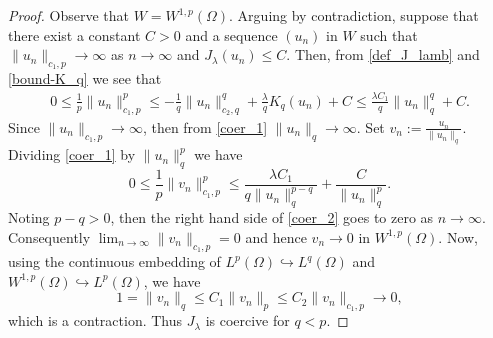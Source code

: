\documentclass[pdflatex,sn-mathphys-num]{sn-jnl}
\theoremstyle{thmstyleone}%
\theoremstyle{thmstyletwo}%
\theoremstyle{thmstylethree}%
\theoremstyle{thmstylethree}%
\begin{document}
\begin{proof}
    Observe that $W=W^{1,p}(\Omega)$.
    Arguing by contradiction,  suppose that there exist a constant $C>0$ and a sequence $(u_n)$ in $W$ such that $\|u_n\|_{c_1,p} \to \infty $ as $n\to \infty$ and $J_\lambda (u_n)\leqslant C$. Then,  from \eqref{def_J_lamb} and \eqref{bound-K_q} we see that
    \begin{align}\label{coer_1}
 0  \leqslant \frac{1}{p}\|u_n\|_{c_1,p}^p    \leqslant -\frac{1}{q}\|u_n\|_{c_2,q}^q+ \frac{\lambda}{q}K_q(u_n) +C 
 \leqslant  \frac{\lambda C_1}{q} \|u_n\|_q^q+C. 
    \end{align}
Since $\|u_n\|_{c_1,p}\to \infty$, then from \eqref{coer_1} $\|u_n\|_{q}\to \infty$. Set $v_n:=\frac{u_n}{\|u_n\|_q}$. Dividing  \eqref{coer_1} by $\|u_n\|_q^p$ we have
   \begin{equation}\label{coer_2}
 0\leqslant \frac{1}{p}\|v_n\|_{c_1,p}^p  \leqslant  \frac{\lambda C_1}{q\|u_n\|_q^{p-q}} +\frac{C}{\|u_n\|_q^{p}}. 
    \end{equation}
Noting $p-q>0$, then the right hand side of  \eqref{coer_2} goes to zero as $n\to \infty$. Consequently $\lim_{n\to \infty}\|v_n\|_{c_1,p}=0$ and hence $v_n\to 0$ in $W^{1,p}(\Omega)$.
Now,  using the continuous embedding of $L^p(\Omega) \hookrightarrow L^q(\Omega)$ and $W^{1,p}(\Omega) \hookrightarrow L^p(\Omega)$, we have
\begin{equation*}
    1=\|v_n\|_q \leqslant C_1\|v_n\|_p \leqslant C_2 \|v_n\|_{c_1,p}\to 0,
\end{equation*}
which is a contraction. Thus $J_{\lambda}$ is coercive for  $q<p$.
\end{proof}
\end{document}
